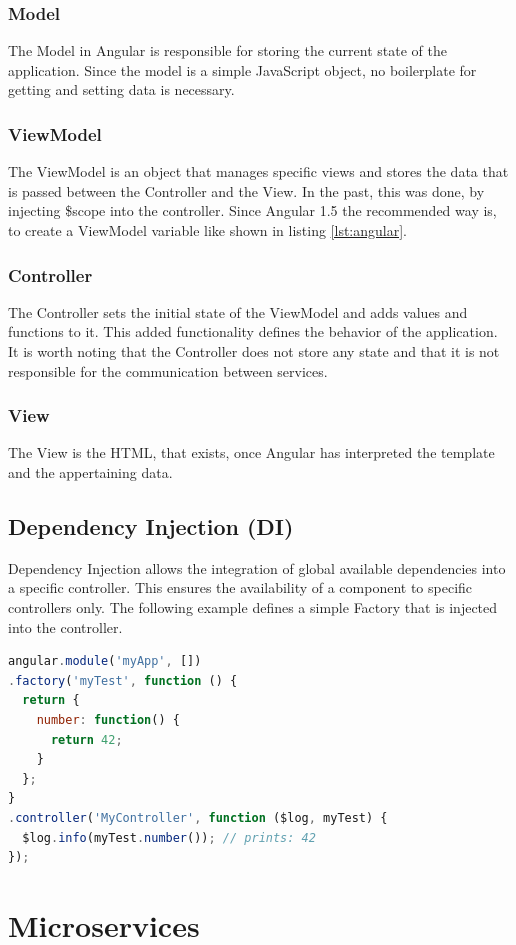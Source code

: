 \subsubsection{Model}
The Model in Angular is responsible for storing the current state of the application. Since the model is a simple JavaScript object, no boilerplate for getting and setting data is necessary.

\subsubsection{ViewModel}
The ViewModel is an object that manages specific views and stores the data that is passed between the Controller and the View. In the past, this was done, by injecting \$scope into the controller. Since Angular 1.5 the recommended way is, to create a ViewModel variable like shown in listing \ref{lst:angular}.

\subsubsection{Controller}
The Controller sets the initial state of the ViewModel and adds values and functions to it. This added functionality defines the behavior of the application. It is worth noting that the Controller does not store any state and that it is not responsible for the communication between services.

\subsubsection{View}
The View is the HTML, that exists, once Angular has interpreted the template and the appertaining data.

\subsection{Dependency Injection (DI)}
Dependency Injection allows the integration of global available dependencies into a specific controller. This ensures the availability of a component to specific controllers only. The following example defines a simple Factory that is injected into the controller.\\

\begin{lstlisting}[language=JavaScript, caption=Dependency Injection Beispiel]
angular.module('myApp', [])
.factory('myTest', function () {
  return {
    number: function() {
	  return 42;
    }
  };
}
.controller('MyController', function ($log, myTest) {
  $log.info(myTest.number()); // prints: 42
});
\end{lstlisting}

\section{Microservices} 
